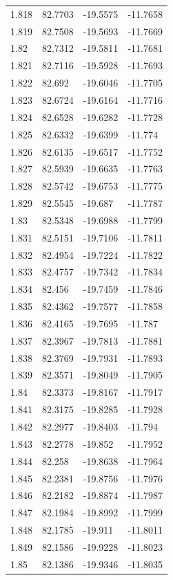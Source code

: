 \begin{tabular}{llll}
1.818 & 82.7703 & -19.5575 & -11.7658 \\
1.819 & 82.7508 & -19.5693 & -11.7669 \\
1.82 & 82.7312 & -19.5811 & -11.7681 \\
1.821 & 82.7116 & -19.5928 & -11.7693 \\
1.822 & 82.692 & -19.6046 & -11.7705 \\
1.823 & 82.6724 & -19.6164 & -11.7716 \\
1.824 & 82.6528 & -19.6282 & -11.7728 \\
1.825 & 82.6332 & -19.6399 & -11.774 \\
1.826 & 82.6135 & -19.6517 & -11.7752 \\
1.827 & 82.5939 & -19.6635 & -11.7763 \\
1.828 & 82.5742 & -19.6753 & -11.7775 \\
1.829 & 82.5545 & -19.687 & -11.7787 \\
1.83 & 82.5348 & -19.6988 & -11.7799 \\
1.831 & 82.5151 & -19.7106 & -11.7811 \\
1.832 & 82.4954 & -19.7224 & -11.7822 \\
1.833 & 82.4757 & -19.7342 & -11.7834 \\
1.834 & 82.456 & -19.7459 & -11.7846 \\
1.835 & 82.4362 & -19.7577 & -11.7858 \\
1.836 & 82.4165 & -19.7695 & -11.787 \\
1.837 & 82.3967 & -19.7813 & -11.7881 \\
1.838 & 82.3769 & -19.7931 & -11.7893 \\
1.839 & 82.3571 & -19.8049 & -11.7905 \\
1.84 & 82.3373 & -19.8167 & -11.7917 \\
1.841 & 82.3175 & -19.8285 & -11.7928 \\
1.842 & 82.2977 & -19.8403 & -11.794 \\
1.843 & 82.2778 & -19.852 & -11.7952 \\
1.844 & 82.258 & -19.8638 & -11.7964 \\
1.845 & 82.2381 & -19.8756 & -11.7976 \\
1.846 & 82.2182 & -19.8874 & -11.7987 \\
1.847 & 82.1984 & -19.8992 & -11.7999 \\
1.848 & 82.1785 & -19.911 & -11.8011 \\
1.849 & 82.1586 & -19.9228 & -11.8023 \\
1.85 & 82.1386 & -19.9346 & -11.8035 \\

\end{tabular}
